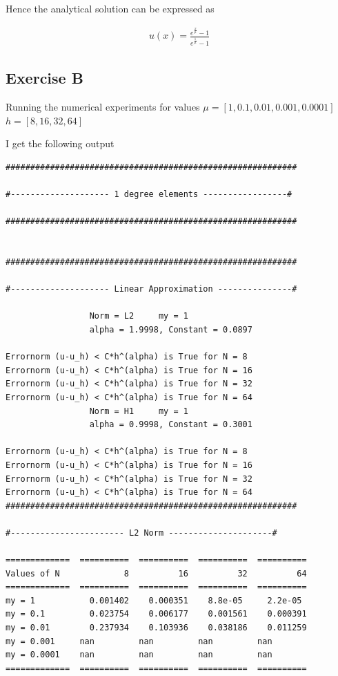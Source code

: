 \documentclass[a4paper,norsk]{article}
\begin{document}
Hence the analytical solution can be expressed as

\begin{align}
u(x) = \frac{e^{\frac{x}{\mu}} -1}{e^{\frac{1}{\mu}} - 1}
\end{align}

\subsection*{Exercise B}
Running the numerical experiments for values \newline
$\mu = [1, 0.1, 0.01, 0.001, 0.0001]$ \newline
$h = [8, 16, 32, 64]$ \newline

I get the following output

\newpage
\begin{lstlisting}[style=terminal]
###########################################################

#-------------------- 1 degree elements -----------------#

###########################################################


###########################################################

#-------------------- Linear Approximation ---------------#

                 Norm = L2     my = 1
                 alpha = 1.9998, Constant = 0.0897

Errornorm (u-u_h) < C*h^(alpha) is True for N = 8
Errornorm (u-u_h) < C*h^(alpha) is True for N = 16
Errornorm (u-u_h) < C*h^(alpha) is True for N = 32
Errornorm (u-u_h) < C*h^(alpha) is True for N = 64
                 Norm = H1     my = 1
                 alpha = 0.9998, Constant = 0.3001

Errornorm (u-u_h) < C*h^(alpha) is True for N = 8
Errornorm (u-u_h) < C*h^(alpha) is True for N = 16
Errornorm (u-u_h) < C*h^(alpha) is True for N = 32
Errornorm (u-u_h) < C*h^(alpha) is True for N = 64
###########################################################

#----------------------- L2 Norm ---------------------#

=============  ==========  ==========  ==========  ==========
Values of N             8          16          32          64
=============  ==========  ==========  ==========  ==========
my = 1           0.001402    0.000351    8.8e-05     2.2e-05
my = 0.1         0.023754    0.006177    0.001561    0.000391
my = 0.01        0.237934    0.103936    0.038186    0.011259
my = 0.001     nan         nan         nan         nan
my = 0.0001    nan         nan         nan         nan
=============  ==========  ==========  ==========  ==========


\end{lstlisting}
\end{document}
